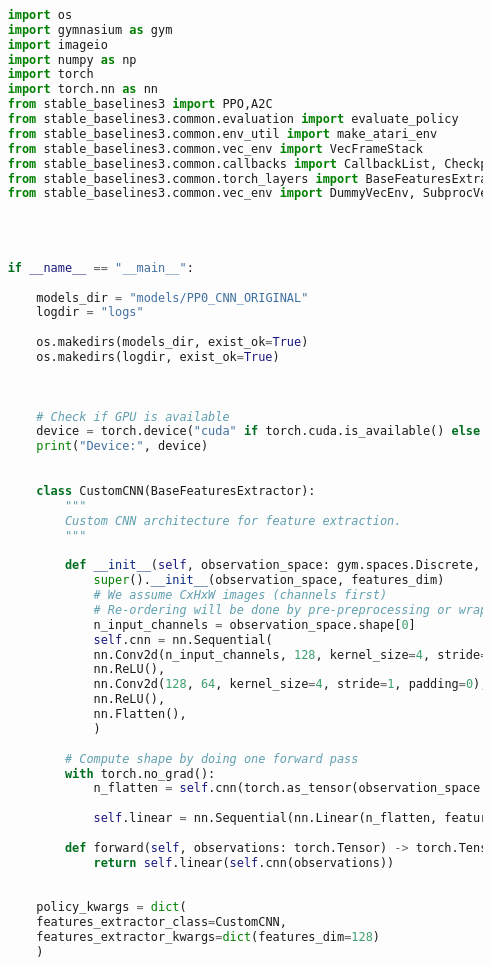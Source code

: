 \begin{lstlisting}[language=Python, caption=Code of PPO algorithm,label={lst:l3}]
	
	import os
	import gymnasium as gym
	import imageio
	import numpy as np
	import torch
	import torch.nn as nn
	from stable_baselines3 import PPO,A2C
	from stable_baselines3.common.evaluation import evaluate_policy
	from stable_baselines3.common.env_util import make_atari_env
	from stable_baselines3.common.vec_env import VecFrameStack
	from stable_baselines3.common.callbacks import CallbackList, CheckpointCallback, EvalCallback,StopTrainingOnNoModelImprovement
	from stable_baselines3.common.torch_layers import BaseFeaturesExtractor
	from stable_baselines3.common.vec_env import DummyVecEnv, SubprocVecEnv
	
	
	
	
	if __name__ == "__main__":
	
		models_dir = "models/PP0_CNN_ORIGINAL"
		logdir = "logs"
		
		os.makedirs(models_dir, exist_ok=True)
		os.makedirs(logdir, exist_ok=True)
		
		
		
		# Check if GPU is available
		device = torch.device("cuda" if torch.cuda.is_available() else "cpu")
		print("Device:", device)
		
		
		class CustomCNN(BaseFeaturesExtractor):
			"""
			Custom CNN architecture for feature extraction.
			"""
				
			def __init__(self, observation_space: gym.spaces.Discrete, features_dim: int = 128):
				super().__init__(observation_space, features_dim)
				# We assume CxHxW images (channels first)
				# Re-ordering will be done by pre-preprocessing or wrapper
				n_input_channels = observation_space.shape[0]
				self.cnn = nn.Sequential(
				nn.Conv2d(n_input_channels, 128, kernel_size=4, stride=1, padding=0),
				nn.ReLU(),
				nn.Conv2d(128, 64, kernel_size=4, stride=1, padding=0),
				nn.ReLU(),
				nn.Flatten(),
				)
			
			# Compute shape by doing one forward pass
			with torch.no_grad():
				n_flatten = self.cnn(torch.as_tensor(observation_space.sample()[None]).float()).shape[1]
				
				self.linear = nn.Sequential(nn.Linear(n_flatten, features_dim), nn.ReLU())
				
			def forward(self, observations: torch.Tensor) -> torch.Tensor:
				return self.linear(self.cnn(observations))
			
		
		policy_kwargs = dict(
		features_extractor_class=CustomCNN,
		features_extractor_kwargs=dict(features_dim=128)
		)
		

\end{lstlisting}

